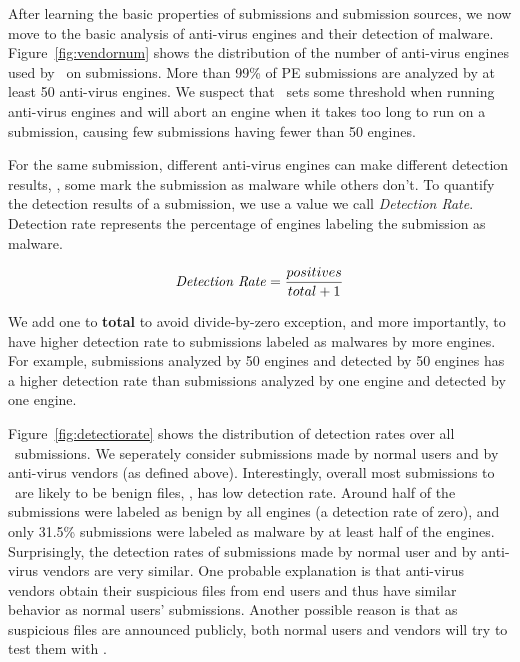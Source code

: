 

After learning the basic properties of submissions and submission sources, 
we now move to the basic analysis of anti-virus engines and their detection of malware.
Figure~\ref{fig:vendornum} shows the distribution of the number of anti-virus engines used by \vt\ on submissions. 
More than 99\% of PE submissions are analyzed by at least 50 anti-virus engines. 
We suspect that \vt\ sets some threshold when running anti-virus engines and 
will abort an engine when it takes too long to run on a submission,
causing few submissions having fewer than 50 engines.

For the same submission, different anti-virus engines can make different detection results, \ie, some mark the submission as malware while others don't.
To quantify the detection results of a submission,
we use a value we call {\em Detection Rate}.
Detection rate represents the percentage of engines labeling the submission as malware. 

$$ \textrm{\textit{Detection Rate}} = \dfrac{positives}{total + 1}$$

We add one to {\bf total} to avoid divide-by-zero exception, and more importantly, 
to have higher detection rate to submissions labeled as malwares by more engines.
For example, submissions analyzed by 50 engines and detected by 50 engines 
has a higher detection rate 
than submissions analyzed by one engine and detected by one engine. 

Figure~\ref{fig:detectiorate} shows the distribution of detection rates over all \pe\ submissions.
We seperately consider submissions made by normal users and by anti-virus vendors 
(as defined above).
Interestingly, overall most submissions to \vt\ are likely to be benign files, \ie, has low detection rate.
Around half of the submissions were labeled as benign by all engines (a detection rate of zero),
and only 31.5\% submissions were labeled as malware by at least half of the engines.
Surprisingly, the detection rates of submissions made by normal user and by anti-virus vendors are very similar.
One probable explanation is that anti-virus vendors obtain their suspicious files 
from end users and thus have similar behavior as normal users' submissions.
Another possible reason is that as suspicious files are announced publicly, 
both normal users and vendors will try to test them with \vt.


